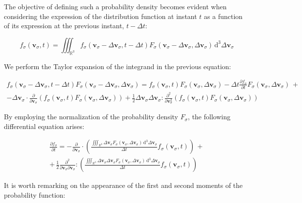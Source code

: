 The objective of defining such a probability density becomes evident when considering the expression of the distribution function at instant $t$ as a function of its expression at the previous instant, $t-\Delta t$:

\begin{equation}
    f_\sigma(\mathbf{v}_\sigma,t)=\iiint_{\mathbb{R}^3}f_\sigma(\mathbf{v}_\sigma-\Delta\mathbf{v}_\sigma,t-\Delta t)F_\sigma(\mathbf{v}_\sigma-\Delta\mathbf{v}_\sigma,\Delta\mathbf{v}_\sigma)\,\mathrm{d}^3\Delta\mathbf{v}_\sigma
\end{equation}

We perform the Taylor expansion of the integrand in the previous equation:

\begin{gather}
    f_\sigma(\mathbf{v}_\sigma-\Delta\mathbf{v}_\sigma,t-\Delta t)F_\sigma(\mathbf{v}_\sigma-\Delta\mathbf{v}_\sigma,\Delta\mathbf{v}_\sigma)=f_\sigma(\mathbf{v}_\sigma,t)F_\sigma(\mathbf{v}_\sigma,\Delta\mathbf{v}_\sigma)-\Delta t\frac{\partial f_\sigma}{\partial t}F_\sigma(\mathbf{v}_\sigma,\Delta\mathbf{v}_\sigma)\,+\\-\Delta\mathbf{v}_\sigma\cdot\frac{\partial}{\partial\mathbf{v}_\sigma}\left(f_\sigma(\mathbf{v}_\sigma,t)F_\sigma(\mathbf{v}_\sigma,\Delta\mathbf{v}_\sigma)\right)+\frac{1}{2}\Delta\mathbf{v}_\sigma\Delta\mathbf{v}_\sigma:\frac{\partial^2}{\partial\mathbf{v}_\sigma^2}\left(f_\sigma(\mathbf{v}_\sigma,t)F_\sigma(\mathbf{v}_\sigma,\Delta\mathbf{v}_\sigma)\right)
\end{gather}

By employing the normalization of the probability density $F_\sigma$, the following differential equation arises:

\begin{gather}
    \frac{\partial f_\sigma}{\partial t}=-\frac{\partial}{\partial\mathbf{v}_\sigma}\cdot\left(\frac{\iiint_{\mathbb{R}^3}\Delta\mathbf{v}_\sigma F_\sigma(\mathbf{v}_\sigma,\Delta\mathbf{v}_\sigma)\,\mathrm{d}^3\Delta\mathbf{v}_\sigma}{\Delta t}f_\sigma(\mathbf{v}_\sigma,t)\right)\,+\\+\,\frac{1}{2}\frac{\partial^2}{\partial\mathbf{v}_\sigma\partial\mathbf{v}_\sigma}:\left(\frac{\iiint_{\mathbb{R}^3}\Delta\mathbf{v}_\sigma\Delta\mathbf{v}_\sigma F_\sigma(\mathbf{v}_\sigma,\Delta\mathbf{v}_\sigma)\,\mathrm{d}^3\Delta\mathbf{v}_\sigma}{\Delta t}f_\sigma(\mathbf{v}_\sigma,t)\right)
\end{gather}

It is worth remarking on the appearance of the first and second moments of the probability function:


